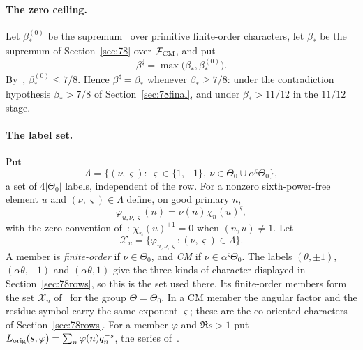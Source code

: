 \documentclass[11pt]{article}
\numberwithin{equation}{section}
\begin{document}
\paragraph{The zero ceiling.} Let $\beta_*^{(0)}$ be the supremum~\cite[eq.~(2.1)]{OAI78} over
primitive finite-order characters, let $\beta_*$ be the supremum of Section~\ref{sec:78} over
$\mathcal F_{\rm CM}$, and put
\begin{equation}\label{eq:s3-beta}
 \beta^\sharp=\max\bigl(\beta_*,\beta_*^{(0)}\bigr).
\end{equation}
By~\cite[Theorem~1.1]{OAI78}, $\beta_*^{(0)}\le7/8$. Hence $\beta^\sharp=\beta_*$ whenever
$\beta_*\ge7/8$: under the contradiction hypothesis $\beta_*>7/8$ of Section~\ref{sec:78final}, and under
$\beta_*>11/12$ in the $11/12$ stage.

\paragraph{The label set.} Put
\begin{equation}\label{eq:d162}
 \Lambda=\bigl\{(\nu,\varsigma):\ \varsigma\in\{1,-1\},\ \nu\in\Theta_0\cup\alpha^{\varsigma}\Theta_0\bigr\},
\end{equation}
a set of $4|\Theta_0|$ labels, independent of the row. For a nonzero sixth-power-free element $u$
and $(\nu,\varsigma)\in\Lambda$ define, on good primary $n$,
\begin{equation}\label{eq:d163}
 \varphi_{u,\nu,\varsigma}(n)=\nu(n)\chi_n(u)^{\varsigma},
\end{equation}
with the zero convention of~\cite[Section~4.1]{OAI78}: $\chi_n(u)^{\pm1}=0$ when $(n,u)\ne1$. Let
\begin{equation}\label{eq:d164}
 \mathcal X_u=\{\varphi_{u,\nu,\varsigma}:(\nu,\varsigma)\in\Lambda\}.
\end{equation}
A member is \emph{finite-order} if $\nu\in\Theta_0$, and \emph{CM} if $\nu\in\alpha^\varsigma\Theta_0$.
The labels $(\theta,\pm1)$, $(\overline\alpha\theta,-1)$ and $(\alpha\theta,1)$ give the three kinds of
character displayed in Section~\ref{sec:78rows}, so this is the set used there. Its finite-order
members form the set $\mathcal X_u$ of~\cite[Section~8.1]{OAI78} for the group $\Theta=\Theta_0$. In a
CM member the angular factor and the residue symbol carry the same exponent $\varsigma$; these are
the co-oriented characters of Section~\ref{sec:78rows}. For a member $\varphi$ and $\Re s>1$ put
$L_{\rm orig}(s,\varphi)=\sum_n\varphi(n)q_n^{-s}$, the series of~\cite[Section~8.1]{OAI78}.
\end{document}
